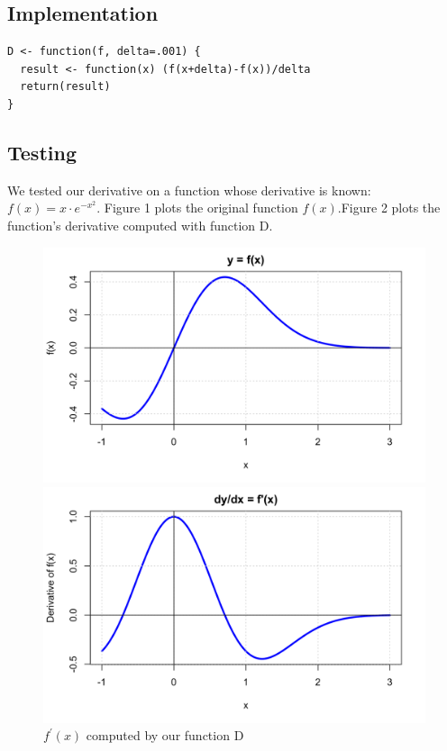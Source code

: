 \documentclass{article}
\begin{document}
\subsection{Implementation}

\begin{lstlisting}
D <- function(f, delta=.001) {
  result <- function(x) (f(x+delta)-f(x))/delta
  return(result)
}
\end{lstlisting}
\noindent
\subsection{Testing}
We tested our derivative on a function whose derivative is known: $f(x) = x \cdot e^{-x^2}$. Figure 1 plots the original function $f(x)$.Figure 2 plots the function's derivative computed with function D.

\begin{figure}[H]
   \begin{minipage}{0.48\textwidth}
     \centering
     \includegraphics[width=.99\linewidth]{dx.png}
     \caption{$f(x) = xe^{-x^2}$}\label{Fig:Data1}
   \end{minipage}\hfill
   \begin{minipage}{0.48\textwidth}
     \centering
     \includegraphics[width=.99\linewidth]{dy_dx.png}
     \caption{$f^{\prime}(x)$ computed by our function D}\label{Fig:Data2}
   \end{minipage}
\end{figure}
\end{document}
